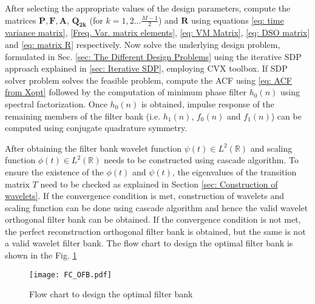 After selecting the appropriate values of the design parameters, compute the matrices $\mathbf{P,F,A}$, $\mathbf{Q_{2k}}$ (for $k=1,2...\frac{M-1}{2}$) and $\mathbf{R}$ using equations \ref{eq: time variance matrix}, \ref{Freq. Var. matrix elements}, \ref{eq: VM Matrix}, \ref{eq: DSO matrix} and \ref{eq: matrix R} respectively. Now solve the underlying design problem, formulated in Sec. \ref{sec: The Different Design Problems} using the iterative SDP approach explained in \ref{sec: Iterative SDP}, employing CVX toolbox. If SDP solver problem solves the feasible problem, compute the ACF using \ref{eq: ACF from Xopt} followed by the computation of minimum phase filter $h_0(n)$ using spectral factorization. Once $h_0(n)$ is obtained, impulse response of the remaining members of the filter bank (i.e. $h_1(n)$, $f_0(n)$ and $f_1(n)$) can be computed using conjugate quadrature symmetry.

After obtaining the filter bank wavelet function $\psi(t) \in L^2(\mathbb{R})$ and scaling function $\phi(t) \in L^2(\mathbb{R})$ needs to be constructed using cascade algorithm. To ensure the existence of the $\phi(t)$ and $\psi(t)$, the eigenvalues of the transition matrix $T$ need to be checked as explained in Section \ref{sec: Construction of wavelets}. If the convergence condition is met, construction of wavelets and scaling function can be done using cascade algorithm and hence the valid wavelet orthogonal filter bank can be obtained. If the convergence condition is not met, the perfect reconstruction orthogonal filter bank is obtained, but the same is not a valid wavelet filter bank. The flow chart to design the optimal filter bank is shown in the Fig. \ref{fig: FC}
\begin{figure}
\texttt{[image: FC\_OFB.pdf]}
\caption{Flow chart to design the optimal filter bank}
\label{fig: FC}
\end{figure}
